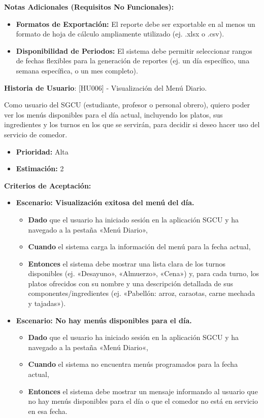 \documentclass[12pt]{article}
\begin{document}
\textbf{Notas Adicionales (Requisitos No Funcionales):}
\begin{itemize}
    \item \textbf{Formatos de Exportación:} El reporte debe ser exportable en al menos un formato de hoja de cálculo ampliamente utilizado (ej. .xlsx o .csv).
    \item \textbf{Disponibilidad de Periodos:} El sistema debe permitir seleccionar rangos de fechas flexibles para la generación de reportes (ej. un día específico, una semana específica, o un mes completo).
\end{itemize}

\pagebreak

\textbf{Historia de Usuario}: [HU006] - Visualización del Menú Diario.

Como usuario del SGCU (estudiante, profesor o personal obrero), quiero poder ver los menús disponibles para el día actual, incluyendo los platos, sus ingredientes y los turnos en los que se servirán, para decidir si deseo hacer uso del servicio de comedor.

\begin{itemize}
    \item \textbf{Prioridad:} Alta
    \item \textbf{\textbf{Estimación:}} 2
\end{itemize}

\textbf{Criterios de Aceptación:}
\begin{itemize}
    \item \textbf{Escenario: Visualización exitosa del menú del día.}
    \begin{itemize}
        \item \textbf{Dado} que el usuario ha iniciado sesión en la aplicación SGCU y ha navegado a la pestaña «Menú Diario»,
        \item \textbf{Cuando} el sistema carga la información del menú para la fecha actual,
        \item \textbf{Entonces} el sistema debe mostrar una lista clara de los turnos disponibles (ej. «Desayuno», «Almuerzo», «Cena») y, para cada turno, los platos ofrecidos con su nombre y una descripción detallada de sus componentes/ingredientes (ej. «Pabellón: arroz, caraotas, carne mechada y tajadas»).
    \end{itemize}

    \item \textbf{Escenario: No hay menús disponibles para el día.}
    \begin{itemize}
        \item \textbf{Dado} que el usuario ha iniciado sesión en la aplicación SGCU y ha navegado a la pestaña «Menú Diario«,
        \item \textbf{Cuando} el sistema no encuentra menús programados para la fecha actual,
        \item \textbf{Entonces} el sistema debe mostrar un mensaje informando al usuario que no hay menús disponibles para el día o que el comedor no está en servicio en esa fecha.
    \end{itemize}
\end{itemize}
\end{document}
